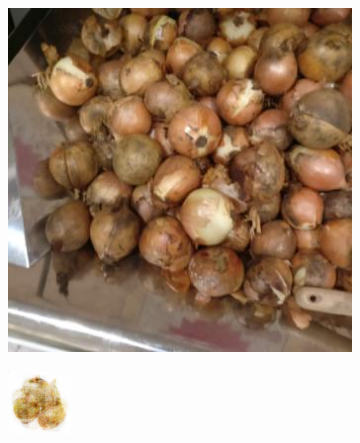 \begin{figure}[t]
\begin{subfigure}[b]{0.14\textwidth}
		\caption{}
		\label{subfig:orange-decoded}
	\end{subfigure} %
	\begin{subfigure}[b]{0.14\textwidth}
		\centering
		\includegraphics[width=\textwidth]{PaperA/decoded-image-figure/Yellow-Onion_030.jpg}
		\caption{}
		\label{subfig:onion-natural}
	\end{subfigure} %
	\begin{subfigure}[b]{0.14\textwidth}
		\centering
		\includegraphics[width=\textwidth]{PaperA/decoded-image-figure/densenet_nov11/Yellow-Onion_decoded.png}

\end{subfigure}
\end{figure}
